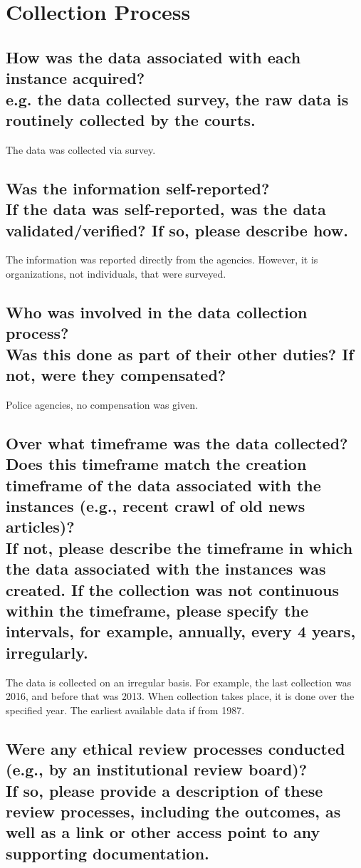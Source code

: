 \documentclass[letterpaper, 10 pt, conference]{ieeeconf}  %
\newcommand{\subtitle}[1]{{\\ \small \normalfont \color{purple} #1}}
\begin{document}
\section{Collection Process}

\subsection{How was the data associated with each instance acquired? \subtitle {e.g. the data collected survey, the raw data is routinely collected by the courts.}}

The data was collected via survey.

\subsection{Was the information self-reported? \subtitle{If the data was self-reported, was the data validated/verified? If so, please describe how.}}


The information was reported directly from the agencies. However, it is organizations, not individuals, that were surveyed.

\subsection{Who was involved in the data collection process? \subtitle{Was this done as part of their other duties? If not, were they compensated?}}

Police agencies, no compensation was given.

\subsection{Over what timeframe was the data collected? Does this timeframe match the creation timeframe of the data associated with the instances (e.g., recent crawl of old news articles)? \subtitle{If not, please describe the timeframe in which the data associated with the instances was created. If the collection was not continuous within the timeframe, please specify the intervals, for example, annually, every 4 years, irregularly.}}

The data is collected on an irregular basis. For example, the last collection was 2016, and before that was 2013. When collection takes place, it is done over the specified year. The earliest available data if from 1987.

\subsection{Were any ethical review processes conducted (e.g., by an institutional review board)? \subtitle{If so, please provide a description of these review processes, including the outcomes, as well as a link or other access point to any supporting documentation.}}
\end{document}
